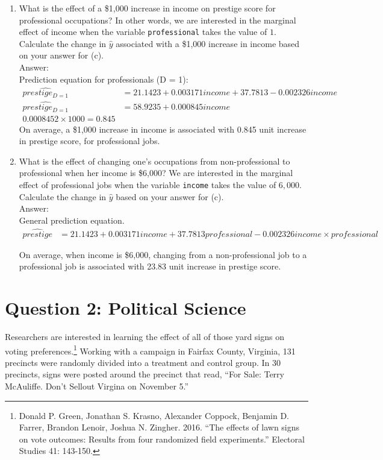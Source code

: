\documentclass[12pt,letterpaper]{article}
\begin{document}
\begin{enumerate}
	\newpage
	\item [(f)]
	What is the effect of a \$1,000 increase in income on prestige score for professional occupations? In other words, we are interested in the marginal effect of income when the variable \texttt{professional} takes the value of $1$. Calculate the change in $\hat{y}$ associated with a \$1,000 increase in income based on your answer for (c).\\
	
	Answer: \\
	Prediction equation for professionals (D = 1):
	\begin{align*}
		\hat{prestige_{D=1}} &= 21.1423 + 0.003171income + 37.7813 - 0.002326income \\
		\hat{prestige_{D=1}} &= 58.9235 + 0.000845income \\
		0.0008452 \times 1000 = 0.845
	\end{align*}
	On average, a \$1,000 increase in income is associated with 0.845 unit increase in prestige score, for professional jobs.
	
	
	
	\item [(g)]
	What is the effect of changing one's occupations from non-professional to professional when her income is \$6,000? We are interested in the marginal effect of professional jobs when the variable \texttt{income} takes the value of $6,000$. Calculate the change in $\hat{y}$ based on your answer for (c).\\
	
	Answer: \\
	General prediction equation.
	\begin{align*}
		\hat{prestige} &= 21.1423 + 0.003171income + 37.7813professional - 0.002326income \times professional
	\end{align*}

	
	On average, when income is \$6,000, changing from a non-professional job to a professional job is associated with 23.83 unit increase in prestige score.
	
	
	\end{enumerate}

\newpage

\section*{Question 2: Political Science}
\vspace{.25cm}
\noindent 	Researchers are interested in learning the effect of all of those yard signs on voting preferences.\footnote{Donald P. Green, Jonathan	S. Krasno, Alexander Coppock, Benjamin D. Farrer,	Brandon Lenoir, Joshua N. Zingher. 2016. ``The effects of lawn signs on vote outcomes: Results from four randomized field experiments.'' Electoral Studies 41: 143-150. } Working with a campaign in Fairfax County, Virginia, 131 precincts were randomly divided into a treatment and control group. In 30 precincts, signs were posted around the precinct that read, ``For Sale: Terry McAuliffe. Don't Sellout Virgina on November 5.'' \\
\end{document}
